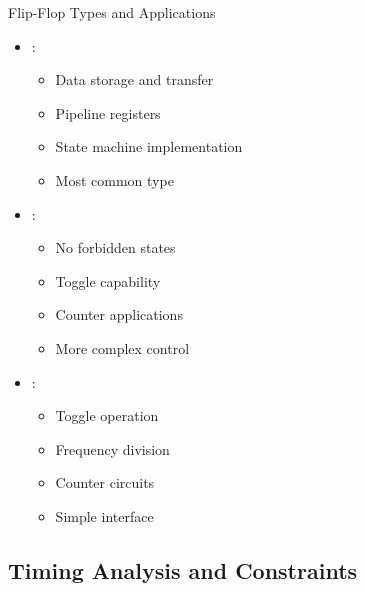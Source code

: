 \begin{frame}{Flip-Flop Types and Applications}
\begin{itemize}
\item {}:
\begin{itemize}
\item Data storage and transfer
\item Pipeline registers
\item State machine implementation
\item Most common type
\end{itemize}
\vspace{0.3cm}
\item {}:
\begin{itemize}
\item No forbidden states
\item Toggle capability
\item Counter applications
\item More complex control
\end{itemize}
\vspace{0.3cm}
\item {}:
\begin{itemize}
\item Toggle operation
\item Frequency division
\item Counter circuits
\item Simple interface
\end{itemize}
\end{itemize}
\end{frame}

\subsection{Timing Analysis and Constraints}

